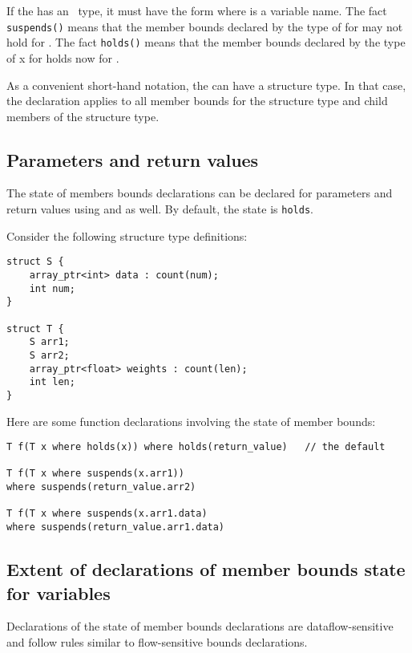 If the  has an \arrayptr\ type, it must
have the form  where  is a variable name. 
The fact \texttt{suspends()} means that the
member bounds declared by the type of  for  may not
hold for . The fact \texttt{holds(}\texttt{)}
means that the member bounds declared by the type of x for 
holds now for .

As a convenient short-hand notation, the  can have
a structure type. In that case, the declaration applies to all member
bounds for the structure type and child members of the structure type.

\subsection{Parameters and return values}

The state of members bounds declarations can be declared for parameters and
return values using  and  as well. By
default, the state is \texttt{holds}.

Consider the following structure type definitions:

\begin{lstlisting}
struct S {
    array_ptr<int> data : count(num);
    int num;
}

struct T {
    S arr1;
    S arr2;
    array_ptr<float> weights : count(len);
    int len;
}
\end{lstlisting}

Here are some function declarations involving the state of member
bounds:
\begin{lstlisting}
T f(T x where holds(x)) where holds(return_value)   // the default 

T f(T x where suspends(x.arr1))
where suspends(return_value.arr2)

T f(T x where suspends(x.arr1.data)
where suspends(return_value.arr1.data)
\end{lstlisting}

\subsection{Extent of declarations of member bounds state for variables}
\label{section:member-bounds-state-extent}

Declarations of the state of member bounds declarations are dataflow-sensitive
and follow rules similar to flow-sensitive bounds declarations.

